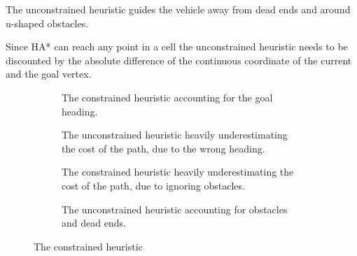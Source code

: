 The unconstrained heuristic guides the vehicle away from dead ends and around u-shaped obstacles.

Since HA* can reach any point in a cell the unconstrained heuristic needs to be discounted by the absolute difference of the continuous coordinate of the current and the goal vertex.

\begin{figure}[h]
    \centering
    \begin{subfigure}[t]{0.45\textwidth}
        \caption{The constrained heuristic accounting for the goal heading.}
        \label{fig:constrainedGood}
    \end{subfigure}
    \hfill
    \begin{subfigure}[t]{0.45\textwidth}
        \caption{The unconstrained heuristic heavily underestimating the cost of the path, due to the wrong heading.}
        \label{fig:unconstrainedBad}
    \end{subfigure}
        \begin{subfigure}[t]{0.45\textwidth}
        \caption{The constrained heuristic heavily underestimating the cost of the path, due to ignoring obstacles.}
        \label{fig:constrainedBad}
    \end{subfigure}
    \hfill
    \begin{subfigure}[t]{0.45\textwidth}
        \caption{The unconstrained heuristic accounting for obstacles and dead ends.}
        \label{fig:unconstrainedGood}
    \end{subfigure}
    \caption{The constrained heuristic}
    \label{fig:heuristicComparison}
\end{figure}